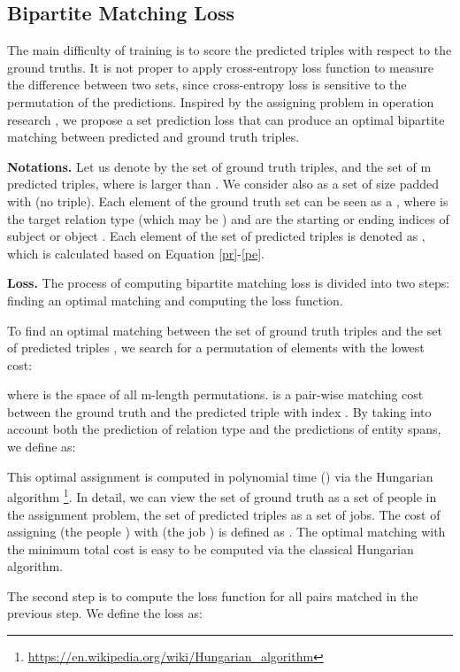 \documentclass[letterpaper]{article} \usepackage{aaai21}  \usepackage{times}  \usepackage{helvet} \usepackage{courier}  \usepackage[hyphens]{url}  \usepackage{graphicx} \usepackage{amsfonts,amssymb}
\begin{document}
\subsection{Bipartite Matching Loss}
\label{loss}
The main difficulty of training is to score the predicted triples with respect to the ground truths. It is not proper to apply cross-entropy loss function to measure the difference between two sets, since cross-entropy loss is sensitive to the permutation of the predictions. Inspired by the assigning problem in operation research \cite{kuhn1955hungarian}, we propose a set prediction loss that can produce an optimal bipartite matching between predicted and ground truth triples.

\textbf{Notations.} Let us denote by  the set of ground truth triples, and  the set of m predicted triples, where  is larger than . We consider  also as a set of size  padded with  (no triple).  Each element  of the ground truth set can be seen as a ,  where  is the target relation type (which may be ) and  are the starting or ending indices of subject  or object . Each element  of the set of predicted  triples is denoted as , which is calculated based on Equation \ref{pr}-\ref{pe}.


\textbf{Loss. } The process of computing bipartite matching loss is divided into two steps: finding an optimal matching and computing the loss function.

To find an optimal matching between the set of ground truth triples  and the set of predicted triples , we search for a permutation of elements  with the lowest cost:

where  is the space of all m-length permutations.   is a pair-wise matching cost between the ground truth  and the predicted triple with index . By taking into account both the prediction of relation type and the predictions of entity spans, we define  as:


This optimal assignment  is computed in polynomial time () via the Hungarian algorithm \footnote{ \url{https://en.wikipedia.org/wiki/Hungarian_algorithm}}. In detail, we can view the set of ground truth  as a set of people in the assignment problem, the set of predicted triples  as a set of jobs. The cost of assigning  (the people ) with  (the job ) is defined as  . The optimal matching with the minimum total cost is easy to be computed via the classical Hungarian algorithm.

The second step is to compute the loss function for all pairs matched in the previous step. We define the loss as:
\end{document}
